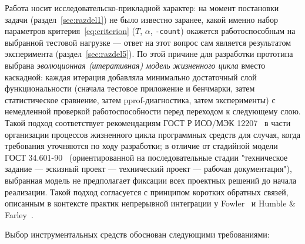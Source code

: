 \documentclass[12pt,a4paper]{article}
\numberwithin{equation}{section}
\begin{document}
Работа носит исследовательско-прикладной характер: на момент постановки
задачи (раздел~\ref{sec:razdel1}) не было известно заранее, какой именно
набор параметров критерия~\eqref{eq:criterion} ($T$, $\alpha$,
\texttt{-count}) окажется работоспособным на выбранной тестовой нагрузке —
ответ на этот вопрос сам является результатом эксперимента
(раздел~\ref{sec:razdel5}). По этой причине для разработки прототипа
выбрана \emph{эволюционная (итеративная) модель жизненного цикла} вместо
каскадной: каждая итерация добавляла минимально достаточный слой
функциональности (сначала тестовое приложение и бенчмарки, затем
статистическое сравнение, затем pprof-диагностика, затем эксперименты) с
немедленной проверкой работоспособности перед переходом к следующему
слою. Такой подход соответствует рекомендациям ГОСТ Р ИСО/МЭК
12207~\cite{gost12207} в части организации процессов жизненного цикла
программных средств для случая, когда требования уточняются по ходу
разработки; в отличие от стадийной модели ГОСТ 34.601-90~\cite{gost34601}
(ориентированной на последовательные стадии "техническое задание — эскизный
проект — технический проект — рабочая документация"), выбранная модель не
предполагает фиксации всех проектных решений до начала реализации. Такой
подход согласуется с принципом коротких обратных связей, описанным в
контексте практик непрерывной интеграции у Fowler~\cite{fowler-ci} и
Humble \& Farley~\cite{humble-farley2010}.

Выбор инструментальных средств обоснован следующими требованиями:
\end{document}
